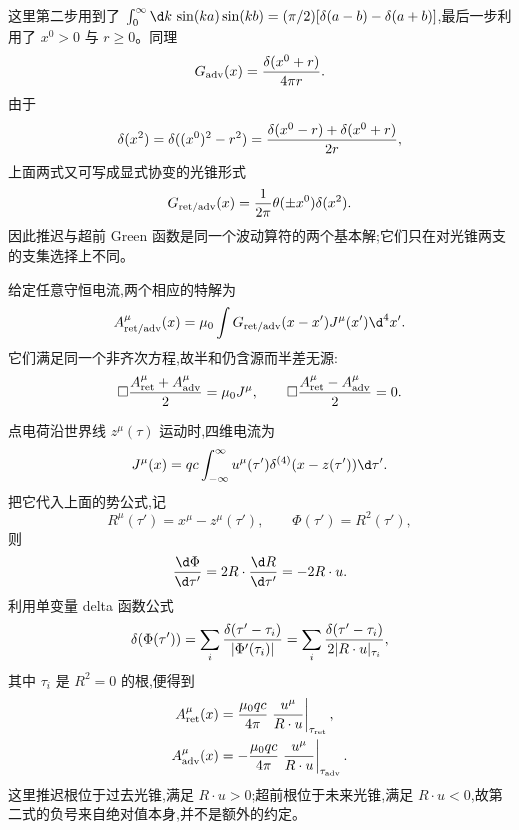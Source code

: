 这里第二步用到了 $\int_0^\infty\d k\,\sin(ka)\sin(kb)=(\pi/2)[\delta(a-b)-\delta(a+b)]$,最后一步利用了 $x^0>0$ 与 $r\geq0$。同理
\begin{equation*}
 G_{\mathrm{adv}}(x)={\delta(x^0+r)\over4\pi r}.
\end{equation*}
由于
\begin{equation*}
 \delta(x^2)
 =\delta((x^0)^2-r^2)
 ={\delta(x^0-r)+\delta(x^0+r)\over2r},
\end{equation*}
上面两式又可写成显式协变的光锥形式
\begin{equation*}
 G_{\mathrm{ret/adv}}(x)
 ={1\over2\pi}\theta(\pm x^0)\delta(x^2).
\end{equation*}
因此推迟与超前 Green 函数是同一个波动算符的两个基本解;它们只在对光锥两支的支集选择上不同。

给定任意守恒电流,两个相应的特解为
\begin{equation*}
 A_{\mathrm{ret/adv}}^\mu(x)
 =\mu_0\int G_{\mathrm{ret/adv}}(x-x')J^\mu(x')\d^4x'.
\end{equation*}
它们满足同一个非齐次方程,故半和仍含源而半差无源:
\begin{equation*}
 \Box{A_{\mathrm{ret}}^\mu+A_{\mathrm{adv}}^\mu\over2}
 =\mu_0J^\mu,
 \qquad
 \Box{A_{\mathrm{ret}}^\mu-A_{\mathrm{adv}}^\mu\over2}=0.
\end{equation*}

点电荷沿世界线 $z^\mu(\tau)$ 运动时,四维电流为
\begin{equation*}
 J^\mu(x)=qc\int_{-\infty}^{\infty}
 u^\mu(\tau')\delta^{(4)}(x-z(\tau'))\d\tau'.
\end{equation*}
把它代入上面的势公式,记
\begin{equation*}
 R^\mu(\tau')=x^\mu-z^\mu(\tau'),
 \qquad
 \Phi(\tau')=R^2(\tau'),
\end{equation*}
则
\begin{equation*}
 {\d\Phi\over\d\tau'}
 =2R\cdot{\d R\over\d\tau'}
 =-2R\cdot u.
\end{equation*}
利用单变量 delta 函数公式
\begin{equation*}
 \delta(\Phi(\tau'))
 =\sum_i{\delta(\tau'-\tau_i)\over|\Phi'(\tau_i)|}
 =\sum_i{\delta(\tau'-\tau_i)\over2|R\cdot u|_{\tau_i}},
\end{equation*}
其中 $\tau_i$ 是 $R^2=0$ 的根,便得到
\begin{align*}
 A_{\mathrm{ret}}^\mu(x)
 &= {\mu_0qc\over4\pi}
 \left.{u^\mu\over R\cdot u}\right|_{\tau_{\mathrm{ret}}},\\
 A_{\mathrm{adv}}^\mu(x)
 &=-{\mu_0qc\over4\pi}
 \left.{u^\mu\over R\cdot u}\right|_{\tau_{\mathrm{adv}}}.
\end{align*}
这里推迟根位于过去光锥,满足 $R\cdot u>0$;超前根位于未来光锥,满足 $R\cdot u<0$,故第二式的负号来自绝对值本身,并不是额外的约定。

